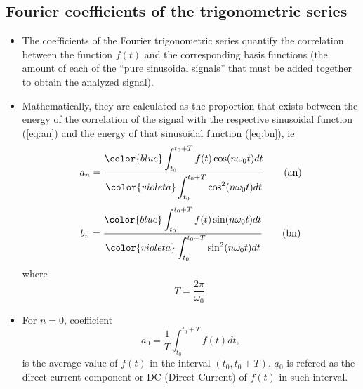 \subsection{Fourier coefficients of the trigonometric series}
\begin{itemize}
\item The coefficients of the Fourier trigonometric series quantify
  the correlation between the function $f(t)$ and the corresponding
  basis functions (the amount of each of the ``pure sinusoidal
  signals'' that must be added together to obtain the analyzed
  signal).
\item Mathematically, they are calculated as the proportion that
  exists between the energy of the correlation of the signal with the
  respective sinusoidal function (\ref{eq:an}) and the energy of that
  sinusoidal function (\ref{eq:bn}), ie
  \begin{equation}
    a_n=\frac{\displaystyle
      {\color{blue} \int_{t_0}^{t_0+T}f(t)\cos(n\omega_0t)dt}
    }{\displaystyle
      {\color{violeta} \int_{t_0}^{t_0+T}\cos^2(n\omega_0t)dt}
    } \tag{an}
    \label{eq:an}
  \end{equation}
  \begin{equation}
    b_n=\frac{\displaystyle
      {\color{blue} \int_{t_0}^{t_0+T}f(t)\sin(n\omega_0t)dt}
    }{\displaystyle
      {\color{violeta} \int_{t_0}^{t_0+T}\sin^2(n\omega_0t)dt}
    } \label{eq:bn} \tag{bn}
  \end{equation}
  where
  \begin{equation*}
  T=\frac{2\pi}{\omega_0}.
  \end{equation*}
\item For $n=0$, coefficient
  \begin{equation*}
    a_0 = \frac{1}{T}\int_{t_0}^{t_0+T} f(t)dt,
  \end{equation*}
  is the average value of $f(t)$ in the interval $(t_0, t_0+T)$. $a_0$
  is refered as the direct current component or DC (Direct Current) of
  $f(t)$ in such interval.


\end{itemize}
